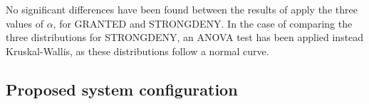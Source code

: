 \documentclass[a4paper,10pt,twocolumn,preprint,3p]{elsarticle}
\begin{document}
No significant differences have been found between the results of apply the
three values of $\alpha$, for GRANTED and STRONGDENY. %
In the case of comparing the three distributions %
for STRONGDENY, an ANOVA test has been applied instead Kruskal-Wallis,
as these distributions follow a normal curve. %

\subsection{Proposed system configuration}

%
%
%

\end{document}
